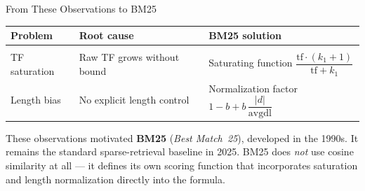 \documentclass[aspectratio=169]{beamer}
\begin{document}
\begin{frame}{From These Observations to BM25}

\begin{center}
\renewcommand{\arraystretch}{1.4}
\begin{tabular}{l l l}
\hline
\textbf{Problem} & \textbf{Root cause} & \textbf{BM25 solution} \\
\hline
\\
TF saturation & Raw TF grows without bound &
  Saturating function $\dfrac{\text{tf}\cdot(k_1+1)}{\text{tf}+k_1}$ \\[8pt]
Length bias & No explicit length control &
  Normalization factor $1 - b + b\,\dfrac{|d|}{\text{avgdl}}$ \\[8pt]
\hline
\end{tabular}
\end{center}

\begin{tcolorbox}[colback=blue!5!white, colframe=blue!75!black,
  title=\textbf{Historical context}]
These observations motivated \textbf{BM25} (\emph{Best Match~25}),
developed in the 1990s.  It remains the standard sparse-retrieval baseline in 2025. BM25 does \emph{not} use cosine similarity at all ---
it defines its own scoring function that incorporates
saturation and length normalization directly into the formula.
\end{tcolorbox}

\end{frame}
%
%
\end{document}

